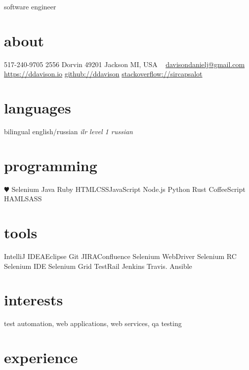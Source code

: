 \documentclass[]{ddavison-resume}
\begin{document}
       {software engineer}


\begin{aside}
  \section{about}
  	517-240-9705
    2556 Dorvin
    49201 Jackson
    MI, USA
    ~
    \href{mailto:davisondanielj@gmail.com}{davisondanielj@gmail.com}
    \href{https://ddavison.io}{https://ddavison.io}
    \href{https://github.com/ddavison}{github://ddavison}
    \href{https://stackoverflow.com/users/1695163/sircapsalot}{stackoverflow://sircapsalot}
  \section{languages}
    bilingual english/russian
	\emph{ilr level 1 russian}
  \section{programming}
    {\color{red} $\varheartsuit$} Selenium
	Java     
    Ruby
    HTML\bullet CSS\bullet JavaScript
    Node.js
    Python
    Rust
    CoffeeScript
    HAML\bullet SASS
  \section{tools}
	IntelliJ IDEA\bullet Eclipse  	
	Git  	
  	JIRA\bullet Confluence
  	Selenium WebDriver
  	Selenium RC
  	Selenium IDE
  	Selenium Grid
  	TestRail
  	Jenkins
  	Travis.
  	Ansible
\end{aside}

\section{interests}

test automation, web applications, web services, qa testing

\section{experience}
\end{document}
